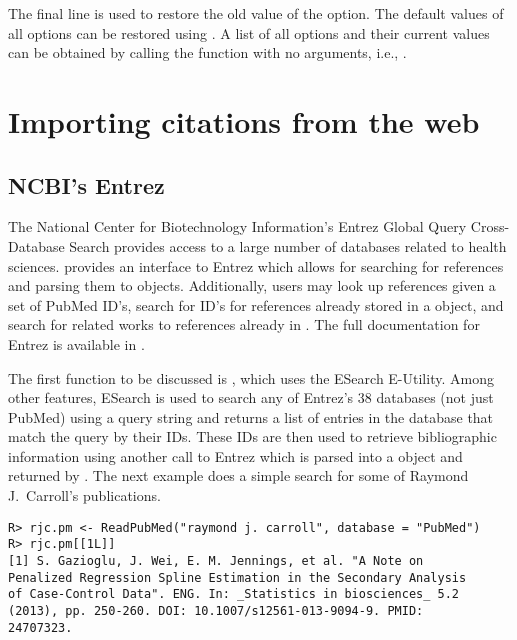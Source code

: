 \documentclass[article]{jss}\usepackage[]{graphicx}\usepackage[]{color}
\makeatletter
\newenvironment{kframe}{%
 \def\at@end@of@kframe{}%
 \ifinner\ifhmode%
  \def\at@end@of@kframe{\end{minipage}}%
  \begin{minipage}{\columnwidth}%
 \fi\fi%
 \def\FrameCommand##1{\hskip\@totalleftmargin \hskip-\fboxsep
 \colorbox{shadecolor}{##1}\hskip-\fboxsep
     \hskip-\linewidth \hskip-\@totalleftmargin \hskip\columnwidth}%
 \MakeFramed {\advance\hsize-\width
   \@totalleftmargin\z@ \linewidth\hsize
   \@setminipage}}%
 {\par\unskip\endMakeFramed%
 \at@end@of@kframe}
\newenvironment{knitrout}{}{} %
\newcommand{\ourpkg}{\pkg{RefManageR}}
\makeatother
\begin{document}
The final line is used to restore the old value of the option.  The default values of all options can be restored using .  A list of all options and their current values can be obtained by calling the function with no arguments, i.e., .
\section{Importing citations from the web}\label{sec_import}
\subsection{NCBI's Entrez}
The National Center for Biotechnology Information's Entrez Global Query Cross-Database Search provides access to a large number of databases related to health sciences. \ourpkg{} provides an interface to Entrez which allows for searching for references and parsing them to  objects.  Additionally, users may look up references given a set of PubMed ID's, search for ID's for references already stored in a  object, and search for related works to references already in \R{}.  The full documentation for Entrez is available in \citet{entrez}.

The first \ourpkg{} function to be discussed is , which uses the ESearch E-Utility.  Among other features, ESearch is used to search any of Entrez's 38 databases (not just PubMed) using a query string and returns a list of entries in the database that match the query by their IDs. These IDs are then used to retrieve bibliographic information using another call to Entrez which is parsed into a  object and returned by .  The next example does a simple search for some of Raymond J.\ Carroll's publications.
\begin{knitrout}
\color{fgcolor}\begin{kframe}
\begin{verbatim}
R> rjc.pm <- ReadPubMed("raymond j. carroll", database = "PubMed")
R> rjc.pm[[1L]]
[1] S. Gazioglu, J. Wei, E. M. Jennings, et al. "A Note on
Penalized Regression Spline Estimation in the Secondary Analysis
of Case-Control Data". ENG. In: _Statistics in biosciences_ 5.2
(2013), pp. 250-260. DOI: 10.1007/s12561-013-9094-9. PMID:
24707323.
\end{verbatim}
\end{kframe}
\end{knitrout}
\end{document}
